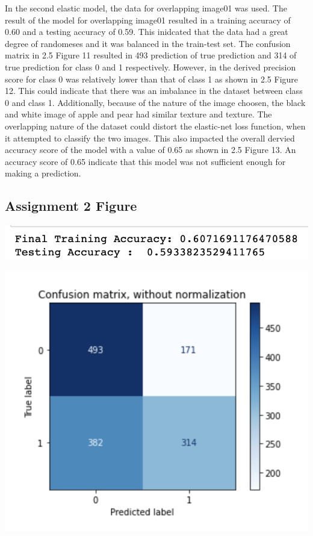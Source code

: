 \documentclass[12pt]{article}
\begin{document}
\begin{multicols*}{2}
  \hspace*{5mm} In the second elastic model, the data for overlapping image01 was used. The result of the model for overlapping
  image01 resulted in a training accuracy of 0.60 and a testing accuracy of 0.59. This inidcated that the data had a great degree of
  randomeses and it was balanced in the train-test set. The confusion matrix in 2.5 Figure 11 resulted in 493 prediction of true prediction 
  and 314 of true prediction for class 0 and 1 respectively. However, in the derived precision score for class 0 was relatively lower than that
  of class 1 as shown in 2.5 Figure 12. This could indicate that there was an imbalance in the dataset between class 0 and class 1. Additionally, because of the nature of the
  image choosen, the black and white image of apple and pear had similar texture and texture. The overlapping nature of the dataset could distort the elastic-net loss function, 
  when it attempted to classify the two images. This also impacted the overall dervied accuracy score of the model with a value of 0.65 as shown in 
  2.5 Figure 13. An accuracy score of 0.65 indicate that this model was not sufficient enough for making a prediction. 


  \subsection{Assignment 2 Figure} 
  \begin{center}

    \includegraphics[scale=0.5]{../screenshot/Overlapping-Elastic-results/results.png}

    \includegraphics[scale=0.5]{../screenshot/Overlapping-Elastic-results/cf.png}


\end{center}
\end{multicols*}
\end{document}
